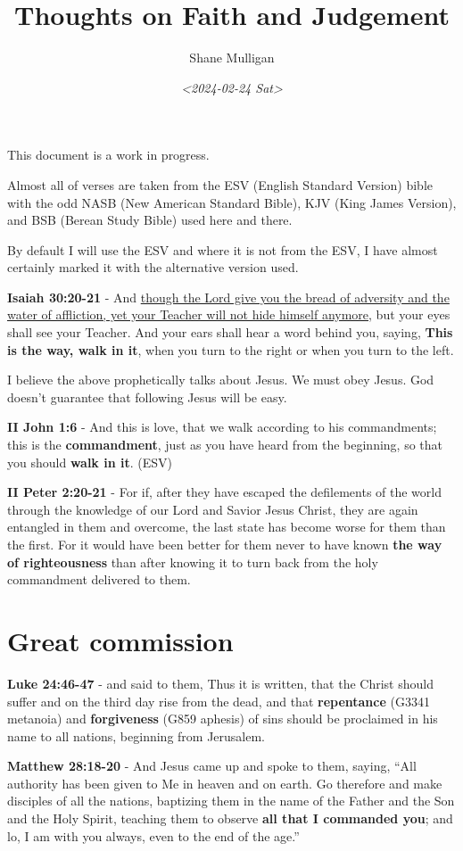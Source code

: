 \documentclass[11pt]{article}
\author{Shane Mulligan}
\date{\textit{<2024-02-24 Sat>}}
\title{Thoughts on Faith and Judgement}
\begin{document}
\maketitle
This document is a work in progress.

Almost all of verses are taken from the ESV
(English Standard Version) bible with the odd NASB
(New American Standard Bible), KJV (King
James Version), and BSB (Berean Study Bible) used here and there.

By default I will use the ESV and where it is
not from the ESV, I have almost certainly marked it with the alternative version used.

\textbf{Isaiah 30:20-21} - And \uline{though the Lord give you the bread of adversity and the water of affliction, yet your Teacher will not hide himself anymore}, but your eyes shall see your Teacher. And your ears shall hear a word behind you, saying, \textbf{This is the way, walk in it}, when you turn to the right or when you turn to the left.

I believe the above prophetically talks about Jesus. We must obey Jesus. God doesn't guarantee that following Jesus will be easy.

\textbf{II John 1:6} - And this is love, that we walk according to his commandments; this is the \textbf{commandment}, just as you have heard from the beginning, so that you should \textbf{walk in it}. (ESV)

\textbf{II Peter 2:20-21} - For if, after they have escaped the defilements of the world through the knowledge of our Lord and Savior Jesus Christ, they are again entangled in them and overcome, the last state has become worse for them than the first. For it would have been better for them never to have known \textbf{the way of righteousness} than after knowing it to turn back from the holy commandment delivered to them.

\section{Great commission}
\label{sec:orge23dd57}
\textbf{Luke 24:46-47} - and said to them, Thus it is written, that the Christ should suffer and on the third day rise from the dead, and that \textbf{repentance} (G3341 metanoia) and \textbf{forgiveness} (G859 aphesis) of sins should be proclaimed in his name to all nations, beginning from Jerusalem.

\textbf{Matthew 28:18-20} - And Jesus came up and spoke to them, saying, “All authority has been given to Me in heaven and on earth. Go therefore and make disciples of all the nations, baptizing them in the name of the Father and the Son and the Holy Spirit, teaching them to observe \textbf{all that I commanded you}; and lo, I am with you always, even to the end of the age.”
\end{document}
